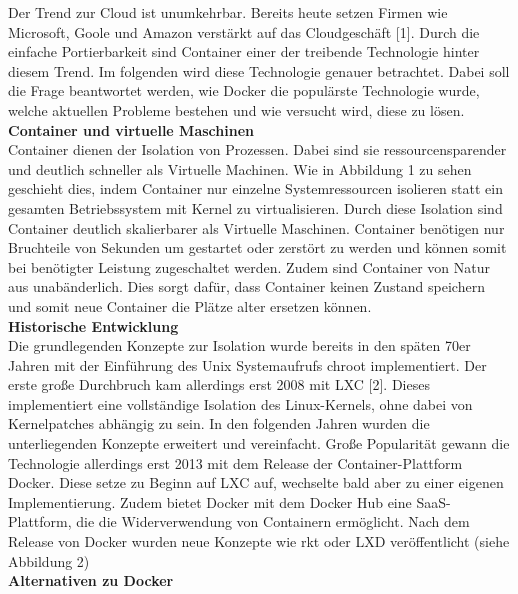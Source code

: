 \begin{multicols}{2}
Der Trend zur Cloud ist unumkehrbar. Bereits heute setzen Firmen wie Microsoft, Goole und Amazon verstärkt auf das Cloudgeschäft [1]. Durch die einfache Portierbarkeit sind Container einer der treibende Technologie hinter diesem Trend. Im folgenden wird diese Technologie genauer betrachtet. Dabei soll die Frage beantwortet werden, wie Docker die populärste Technologie wurde, welche aktuellen Probleme bestehen und wie versucht wird, diese zu lösen.\\

\textbf{Container und virtuelle Maschinen} \\


Container dienen der Isolation von Prozessen. Dabei sind sie ressourcensparender und deutlich schneller als Virtuelle Machinen. Wie in Abbildung 1 zu sehen geschieht dies, indem Container nur einzelne Systemressourcen isolieren statt ein gesamten Betriebssystem mit Kernel zu virtualisieren.
\bildbreit
\bildI
\bildschmal
Durch diese Isolation sind Container deutlich skalierbarer als Virtuelle Maschinen. Container benötigen nur Bruchteile von Sekunden um gestartet oder zerstört zu werden und können somit bei benötigter Leistung zugeschaltet werden. Zudem sind Container von Natur aus unabänderlich. Dies sorgt dafür, dass Container keinen Zustand speichern und somit neue Container die Plätze alter ersetzen können.\\

 \textbf{Historische Entwicklung} \\


Die grundlegenden Konzepte zur Isolation wurde bereits in den späten 70er Jahren mit der Einführung des Unix Systemaufrufs chroot implementiert. Der erste große Durchbruch kam allerdings erst 2008 mit LXC [2]. Dieses implementiert eine vollständige Isolation des Linux-Kernels, ohne dabei von Kernelpatches abhängig zu sein.
\bildbreit
\bildII
\bildschmal
In den folgenden Jahren wurden die unterliegenden Konzepte erweitert und vereinfacht. Große Popularität gewann die Technologie allerdings erst 2013 mit dem Release der Container-Plattform Docker. Diese setze zu Beginn auf LXC auf, wechselte bald aber zu einer eigenen Implementierung. Zudem bietet Docker mit dem Docker Hub eine SaaS-Plattform, die die Widerverwendung von Containern ermöglicht. Nach dem Release von Docker wurden neue Konzepte wie rkt oder LXD veröffentlicht (siehe Abbildung 2)\\

 \textbf{Alternativen zu Docker} \\



\end{multicols}
